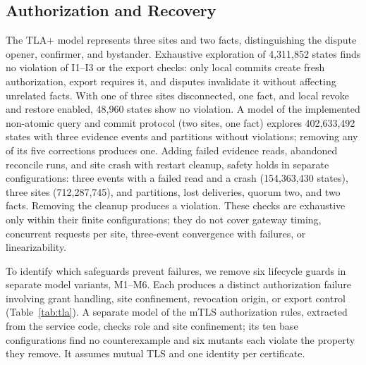 \documentclass[journal]{IEEEtran}
\theoremstyle{definition}
\begin{document}
\subsection{Authorization and Recovery}
\label{sec:lifecycle-results}
The TLA+ model represents three sites and two facts, distinguishing the dispute opener, confirmer, and bystander. Exhaustive exploration of 4,311,852 states finds no violation of I1--I3 or the export checks: only local commits create fresh authorization, export requires it, and disputes invalidate it without affecting unrelated facts. With one of three sites disconnected, one fact, and local revoke and restore enabled, 48,960 states show no violation. A model of the implemented non-atomic query and commit protocol (two sites, one fact) explores 402,633,492 states with three evidence events and partitions without violations; removing any of its five corrections produces one. Adding failed evidence reads, abandoned reconcile runs, and site crash with restart cleanup, safety holds in separate configurations: three events with a failed read and a crash (154,363,430 states), three sites (712,287,745), and partitions, lost deliveries, quorum two, and two facts. Removing the cleanup produces a violation. These checks are exhaustive only within their finite configurations; they do not cover gateway timing, concurrent requests per site, three-event convergence with failures, or linearizability.

To identify which safeguards prevent failures, we remove six lifecycle guards in separate model variants, M1--M6. Each produces a distinct authorization failure involving grant handling, site confinement, revocation origin, or export control (Table~\ref{tab:tla}). A separate model of the mTLS authorization rules, extracted from the service code, checks role and site confinement; its ten base configurations find no counterexample and six mutants each violate the property they remove. It assumes mutual TLS and one identity per certificate.
\end{document}
